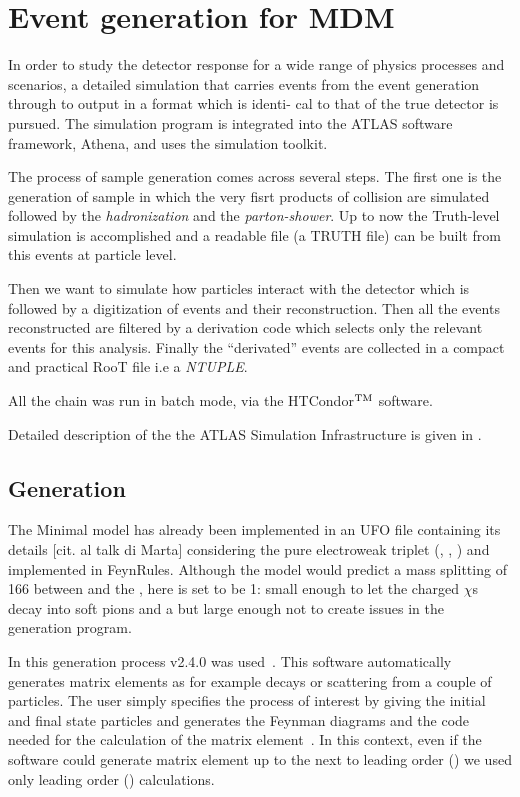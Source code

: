 

\section{Event generation for MDM}
In order to study the detector response for a wide range of physics processes and scenarios, a detailed simulation  that carries events from the event generation through to output in a format which is identi- cal to that of the true detector is pursued. The simulation program is integrated into the ATLAS software framework, Athena, and uses the \geant \cite{geant4} simulation toolkit.

The process of sample generation comes across several steps. The first one is the generation of sample in which the very fisrt products of \pp collision are simulated followed by the \emph{hadronization} and the \emph{parton-shower}. Up to now the Truth-level simulation is accomplished and a readable file (a TRUTH file) can be built from this events at particle level.

Then we want to simulate how particles interact with the detector which is followed by a digitization of events and their reconstruction. Then all the events reconstructed are filtered by a derivation code which selects only the  relevant events for this analysis. Finally the ``derivated'' events are collected in a compact and practical RooT file i.e a \emph{NTUPLE}.

All the chain was run in batch mode, via  the HTCondor$^{\textup{TM}}$ software.

Detailed description of the the ATLAS Simulation Infrastructure is given in \cite{simulation}.



\subsection{Generation}
The Minimal model has already been implemented in an UFO file containing its details [cit. al talk di Marta] considering the pure electroweak triplet (\chip\!, \chizero\!, \chim\!) and implemented in FeynRules. Although the model would predict a mass splitting of \SI{166}{\mev} between \chipm and the \chizero, here is set to be \SI{1}{\gev}: small enough to let the charged $\chi$s decay into soft pions and a \chizero but large enough not to create issues in the generation program. 

In this generation process \MGMCatNLO v2.4.0 was used~\cite{madgraph}. This software automatically generates matrix elements as for example decays or scattering from a couple of particles. The user simply specifies the process of interest by giving the initial and final state particles and \MADGRAPH generates the Feynman diagrams and the code needed for the calculation of the matrix element~\cite{Pottgen:2016807}. In this context, even if the software could generate matrix element up to the next to leading order (\NLO) we used only leading order (\LO) calculations. 

